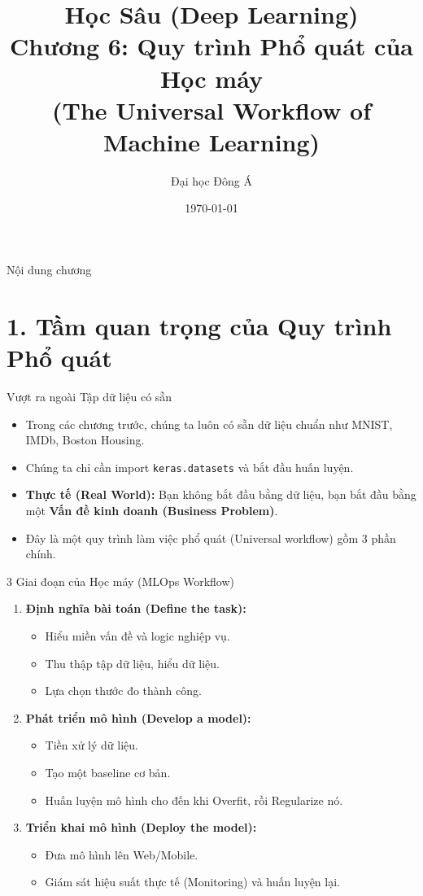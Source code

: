 \documentclass[aspectratio=169]{beamer}
\title[Chương 6: Quy trình ML]{Học Sâu (Deep Learning) \\ \vspace{0.5cm} \Large Chương 6: Quy trình Phổ quát của Học máy \\ (The Universal Workflow of Machine Learning)}
\author{Đại học Đông Á}
\date{\today}
\begin{document}
\begin{frame}
    \titlepage
\end{frame}

\begin{frame}{Nội dung chương}
    \tableofcontents
\end{frame}

\section{1. Tầm quan trọng của Quy trình Phổ quát}

\begin{frame}{Vượt ra ngoài Tập dữ liệu có sẵn}
    \begin{itemize}
        \item Trong các chương trước, chúng ta luôn có sẵn dữ liệu chuẩn như MNIST, IMDb, Boston Housing.
        \item Chúng ta chỉ cần import \texttt{keras.datasets} và bắt đầu huấn luyện.
        \item \textbf{Thực tế (Real World):} Bạn không bắt đầu bằng dữ liệu, bạn bắt đầu bằng một \textbf{Vấn đề kinh doanh (Business Problem)}.
        \item Đây là một quy trình làm việc phổ quát (Universal workflow) gồm 3 phần chính.
    \end{itemize}
\end{frame}

\begin{frame}{3 Giai đoạn của Học máy (MLOps Workflow)}
    \begin{enumerate}
        \item \textbf{Định nghĩa bài toán (Define the task):} 
        \begin{itemize}
            \item Hiểu miền vấn đề và logic nghiệp vụ.
            \item Thu thập tập dữ liệu, hiểu dữ liệu.
            \item Lựa chọn thước đo thành công.
        \end{itemize}
        \item \textbf{Phát triển mô hình (Develop a model):} 
        \begin{itemize}
            \item Tiền xử lý dữ liệu.
            \item Tạo một baseline cơ bản.
            \item Huấn luyện mô hình cho đến khi Overfit, rồi Regularize nó.
        \end{itemize}
        \item \textbf{Triển khai mô hình (Deploy the model):} 
        \begin{itemize}
            \item Đưa mô hình lên Web/Mobile.
            \item Giám sát hiệu suất thực tế (Monitoring) và huấn luyện lại.
        \end{itemize}
    \end{enumerate}
\end{frame}
\end{document}
